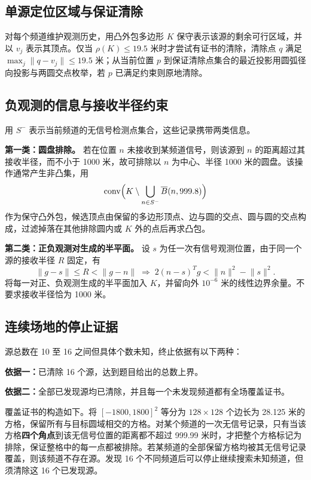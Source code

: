 \documentclass[UTF8,a4paper,zihao=-4,fontset=none]{ctexart}
\begin{document}
\subsection{单源定位区域与保证清除}

对每个频道维护观测历史，用凸外包多边形 \(K\) 保守表示该源的剩余可行区域，并以 \(v_j\) 表示其顶点。仅当 \(\rho(K)\le19.5\) 米时才尝试有证书的清除，清除点 \(q\) 满足 \(\max_j\lVert q-v_j\rVert\le19.5\) 米；从当前位置 \(p\) 到保证清除点集合的最近投影用圆弧径向投影与两圆交点枚举，若 \(p\) 已满足约束则原地清除。

\subsection{负观测的信息与接收半径约束}

用 \(S^-\) 表示当前频道的无信号检测点集合，这些记录携带两类信息。

\textbf{第一类：圆盘排除。} 若在位置 \(n\) 未接收到某频道信号，则该源到 \(n\) 的距离超过其接收半径，而不小于 1000 米，故可排除以 \(n\) 为中心、半径 1000 米的圆盘。该操作通常产生非凸集，用
\begin{equation}
  \operatorname{conv}\Bigl(K\setminus\bigcup_{n\in S^-}\overline{B}(n,999.8)\Bigr)
  \label{eq:q3-disk}
\end{equation}
作为保守凸外包，候选顶点由保留的多边形顶点、边与圆的交点、圆与圆的交点构成，过滤掉落在其他排除圆内或 \(K\) 外的点后再求凸包。

\textbf{第二类：正负观测对生成的半平面。} 设 \(s\) 为任一次有信号观测位置，由于同一个源的接收半径 \(R\) 固定，有
\begin{equation}
  \lVert g-s\rVert\le R<\lVert g-n\rVert
  \;\Longrightarrow\;
  2(n-s)^{T}g<\lVert n\rVert^{2}-\lVert s\rVert^{2}.
  \label{eq:q3-halfplane}
\end{equation}
将每一对正、负观测生成的半平面加入 \(K\)，并留向外 \(10^{-6}\) 米的线性边界余量。不要求接收半径恰为 1000 米。

\subsection{连续场地的停止证据}

源总数在 10 至 16 之间但具体个数未知，终止依据有以下两种：

\textbf{依据一：}已清除 16 个源，达到题目给出的总数上界。

\textbf{依据二：}全部已发现源均已清除，并且每一个未发现频道都有全场覆盖证书。

覆盖证书的构造如下。将 \([-1800,1800]^2\) 等分为 \(128\times128\) 个边长为 28.125 米的方格，保留所有与目标圆域相交的方格。对某个频道的一次无信号记录，只有当该方格\textbf{四个角点}到该无信号位置的距离都不超过 999.99 米时，才把整个方格标记为排除，保证整格中的每一点都被排除。若某频道的全部保留方格均被其无信号记录覆盖，则该频道不存在源。发现 16 个不同频道后可以停止继续搜索未知频道，但须清除这 16 个已发现源。
\end{document}
